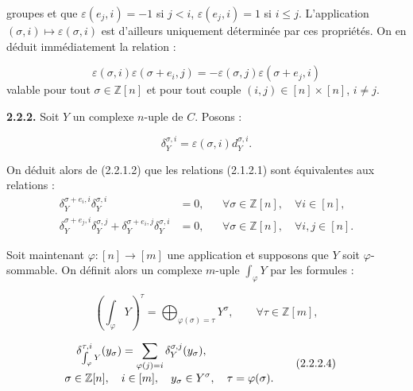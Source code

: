 %
%
groupes et que $\varepsilon(e_j,i)=-1$ si $j<i$,
$\varepsilon(e_j,i)=1$ si $i\leq j$. L'application
$(\sigma,i)\longmapsto\varepsilon(\sigma,i)$ est d'ailleurs uniquement
déterminée par ces propriétés. On en déduit immédiatement la relation :

\begin{equation}
  \varepsilon(\sigma,i)\varepsilon(\sigma+e_i,j)
  =-\varepsilon(\sigma,j)\varepsilon(\sigma+e_j,i)
  \tag{2.2.1.2}
\end{equation}
valable pour tout $\sigma\in\mathbb Z[n]$ et pour tout couple
$(i,j)\in[n]\times[n]$, $i\neq j$.

\noindent\textbf{2.2.2.}\quad
Soit $Y$ un complexe $n$-uple de $C$. Posons :

\begin{equation}
  \delta_Y^{\sigma,i}=\varepsilon(\sigma,i)d_Y^{\sigma,i}.
  \tag{2.2.2.1}
\end{equation}

On déduit alors de (2.2.1.2) que les relations (2.1.2.1) sont équivalentes
aux relations :
\begin{equation}
  \begin{aligned}
    \delta_Y^{\sigma+e_i,i}\delta_Y^{\sigma,i}
      &=0,
      &&\forall\sigma\in\mathbb Z[n],\quad\forall i\in[n],\\
    \delta_Y^{\sigma+e_j,i}\delta_Y^{\sigma,j}
      +\delta_Y^{\sigma+e_i,j}\delta_Y^{\sigma,i}
      &=0,
      &&\forall\sigma\in\mathbb Z[n],\quad\forall i,j\in[n].
  \end{aligned}
  \tag{2.2.2.2}
\end{equation}

Soit maintenant $\varphi\colon[n]\longrightarrow[m]$ une application et
supposons que $Y$ soit $\varphi$-sommable. On définit alors un complexe
$m$-uple $\int_\varphi Y$ par les formules :

\begin{equation}
  \left(\int_\varphi Y\right)^\tau
  =\bigoplus_{\varphi(\sigma)=\tau}Y^\sigma,
  \qquad \forall\tau\in\mathbb Z[m],
  \tag{2.2.2.3}
\end{equation}

\begin{equation}
  \begin{aligned}
    \delta_{\int_\varphi Y}^{\tau,i}(y_\sigma)
      &=\sum_{\varphi(j)=i}\delta_Y^{\sigma,j}(y_\sigma),\\[-1mm]
    &\hspace{-18mm}
      \sigma\in\mathbb Z[n],\quad i\in[m],\quad
      y_\sigma\in Y^\sigma,\quad\tau=\varphi(\sigma).
  \end{aligned}
  \tag{2.2.2.4}
\end{equation}

